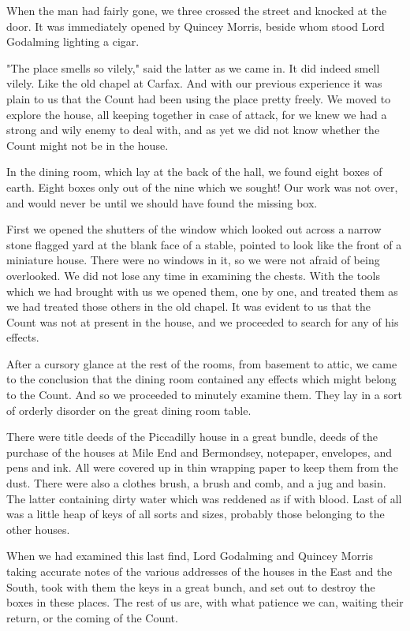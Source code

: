 When the man had fairly gone, we three crossed the street and knocked at the door. It was immediately opened by Quincey Morris, beside whom stood Lord Godalming lighting a cigar. 

"The place smells so vilely," said the latter as we came in. It did indeed smell vilely. Like the old chapel at Carfax. And with our previous experience it was plain to us that the Count had been using the place pretty freely. We moved to explore the house, all keeping together in case of attack, for we knew we had a strong and wily enemy to deal with, and as yet we did not know whether the Count might not be in the house. 

In the dining room, which lay at the back of the hall, we found eight boxes of earth. Eight boxes only out of the nine which we sought! Our work was not over, and would never be until we should have found the missing box. 

First we opened the shutters of the window which looked out across a narrow stone flagged yard at the blank face of a stable, pointed to look like the front of a miniature house. There were no windows in it, so we were not afraid of being overlooked. We did not lose any time in examining the chests. With the tools which we had brought with us we opened them, one by one, and treated them as we had treated those others in the old chapel. It was evident to us that the Count was not at present in the house, and we proceeded to search for any of his effects. 

After a cursory glance at the rest of the rooms, from basement to attic, we came to the conclusion that the dining room contained any effects which might belong to the Count. And so we proceeded to minutely examine them. They lay in a sort of orderly disorder on the great dining room table. 

There were title deeds of the Piccadilly house in a great bundle, deeds of the purchase of the houses at Mile End and Bermondsey, notepaper, envelopes, and pens and ink. All were covered up in thin wrapping paper to keep them from the dust. There were also a clothes brush, a brush and comb, and a jug and basin. The latter containing dirty water which was reddened as if with blood. Last of all was a little heap of keys of all sorts and sizes, probably those belonging to the other houses. 

When we had examined this last find, Lord Godalming and Quincey Morris taking accurate notes of the various addresses of the houses in the East and the South, took with them the keys in a great bunch, and set out to destroy the boxes in these places. The rest of us are, with what patience we can, waiting their return, or the coming of the Count. 
